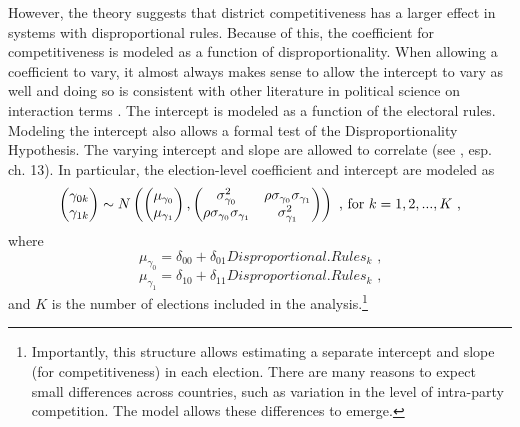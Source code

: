 \documentclass[12pt]{article}
\begin{document}
However, the theory suggests that district competitiveness has a larger effect in systems with disproportional rules. Because of this, the coefficient for competitiveness is modeled as a function of disproportionality. When allowing a coefficient to vary, it almost always makes sense to allow the intercept to vary as well and doing so is consistent with other literature in political science on interaction terms \citep{Friedrich1982, BramborClarkGolder2006}. The intercept is modeled as a function of the electoral rules. Modeling the intercept also allows a formal test of the Disproportionality Hypothesis. The varying intercept and slope are allowed to correlate (see \citealt{GelmanHill2007}, esp. ch. 13). In particular, the election-level coefficient and intercept are modeled as
\begin{equation}
\begin{pmatrix} \gamma_{0k} \\ \gamma_{1k} \end{pmatrix} 
\sim 
{\large} N\begin{pmatrix}  \begin{pmatrix} \mu_{\gamma_{0}} \\ \mu_{\gamma_{1}} \end{pmatrix}, 
\begin{pmatrix}         \sigma^2_{\gamma_{0}}                                           &                 \rho\sigma_{\gamma_{0}}\sigma_{\gamma_{1}} \\
                                 \rho\sigma_{\gamma_{0}}\sigma_{\gamma_{1}}         &                \sigma^2_{\gamma_{1}}
\end{pmatrix}\end{pmatrix} \text{ , for }k = 1, 2, ..., K \text{ ,}
\end{equation}
where 
\begin{equation}\label{eqn:disint_modeled}
\mu_{\gamma_{0}} = \delta_{00} + \delta_{01}Disproportional.Rules_k \text{  ,}
\end{equation}
\begin{equation}\label{eqn:comp_modeled}
\mu_{\gamma_{1}} = \delta_{10} + \delta_{11}Disproportional.Rules_k \text{ ,}
\end{equation}          
and $K$ is the number of elections included in the analysis.\footnote{Importantly, this structure allows estimating a separate intercept and slope (for competitiveness) in each election. There are many reasons to expect small differences across countries, such as variation in the level of intra-party competition. The model allows these differences to emerge.}
                                                                                
\end{document}
